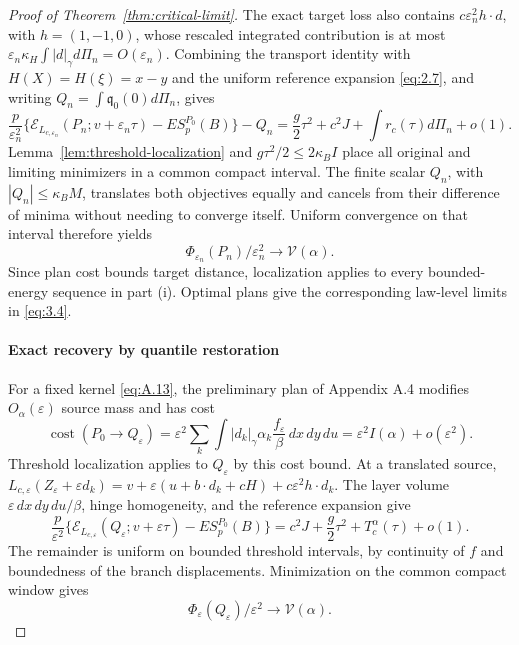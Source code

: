 \begin{proof}[Proof of Theorem~\ref{thm:critical-limit}]
The exact target loss also contains \(c\varepsilon_n^2h\cdot d\), with \(h=(1,-1,0)\), whose rescaled integrated contribution is at most \(\varepsilon_n\kappa_H\int|d|_\gamma d\Pi_n=O(\varepsilon_n)\). Combining the transport identity with \(H(X)=H(\xi)=x-y\) and the uniform reference expansion \eqref{eq:2.7}, and writing \(Q_n=\int\mathfrak q_0(0)d\Pi_n\), gives
\begin{equation}
\frac p{\varepsilon_n^2}
\{\mathscr E_{L_{c,\varepsilon_n}}(P_n;v+\varepsilon_n\tau)
-ES_p^{P_0}(B)\}-Q_n
=\frac g2\tau^2+c^2J+\int r_c(\tau)d\Pi_n+o(1).
\tag{A.33}\label{eq:A.33}
\end{equation}
Lemma~\ref{lem:threshold-localization} and \(g\tau^2/2\le2\kappa_BI\) place all original and limiting minimizers in a common compact interval. The finite scalar \(Q_n\), with \(|Q_n|\le\kappa_BM\), translates both objectives equally and cancels from their difference of minima without needing to converge itself. Uniform convergence on that interval therefore yields
\begin{equation}
\Phi_{\varepsilon_n}(P_n)/\varepsilon_n^2\to\mathcal V(\alpha).
\tag{A.34}\label{eq:A.34}
\end{equation}
Since plan cost bounds target distance, localization applies to every bounded-energy sequence in part (i). Optimal plans give the corresponding law-level limits in \eqref{eq:3.4}.

\paragraph{Exact recovery by quantile restoration}\label{par:quantile-recovery}

For a fixed kernel \eqref{eq:A.13}, the preliminary plan of Appendix A.4 modifies \(O_\alpha(\varepsilon)\) source mass and has cost
\begin{equation}
\operatorname{cost}(P_0\to Q_\varepsilon)
=\varepsilon^2\sum_k\int|d_k|_\gamma\alpha_k
\frac{f_\varepsilon}{\beta}\,dx\,dy\,du
=\varepsilon^2 I(\alpha)+o(\varepsilon^2).
\tag{A.35}\label{eq:A.35}
\end{equation}
Threshold localization applies to \(Q_\varepsilon\) by this cost bound. At a translated source,
\(L_{c,\varepsilon}(Z_\varepsilon+\varepsilon d_k)=v+\varepsilon(u+b\cdot d_k+cH)+c\varepsilon^2h\cdot d_k\).
The layer volume \(\varepsilon\,dx\,dy\,du/\beta\), hinge homogeneity, and the reference expansion give
\begin{equation}
\frac p{\varepsilon^2}
\{\mathscr E_{L_{c,\varepsilon}}(Q_\varepsilon;v+\varepsilon\tau)
-ES_p^{P_0}(B)\}
=c^2J+\frac g2\tau^2+T_c^\alpha(\tau)+o(1).
\tag{A.36}\label{eq:A.36}
\end{equation}
The remainder is uniform on bounded threshold intervals, by continuity of \(f\) and boundedness of the branch displacements. Minimization on the common compact window gives
\begin{equation}
\Phi_\varepsilon(Q_\varepsilon)/\varepsilon^2\to\mathcal V(\alpha).
\tag{A.37}\label{eq:A.37}
\end{equation}


\end{proof}
